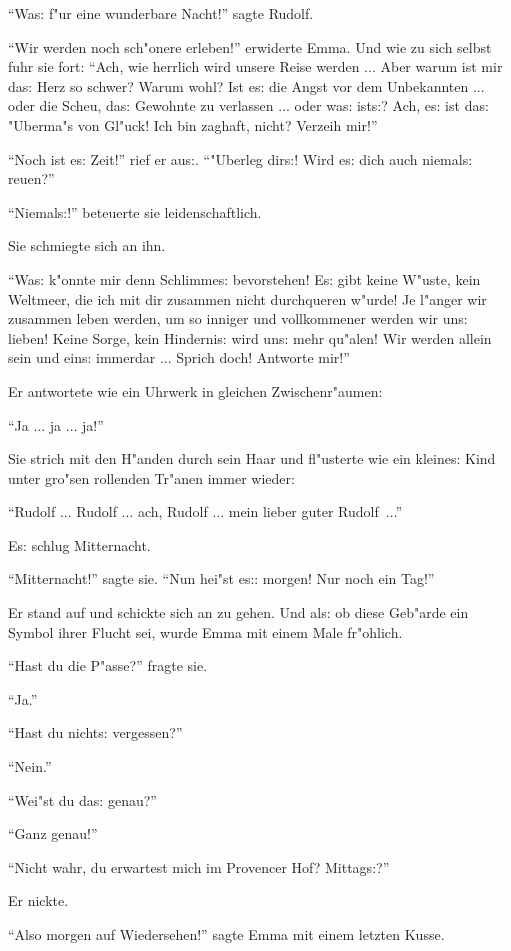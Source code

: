 \documentclass[oneside,12pt]{book}
\newcommand{\s}{s:}%
\begin{document}
"`Wa{\s} f"ur eine wunderbare Nacht!"' sagte Rudolf.

"`Wir werden noch sch"onere erleben!"' erwiderte Emma. Und wie zu
sich selbst fuhr sie fort: "`Ach, wie herrlich wird unsere Reise
werden ... Aber warum ist mir da{\s} Herz so schwer? Warum wohl?
Ist e{\s} die Angst vor dem Unbekannten ... oder die Scheu, da{\s}
Gewohnte zu verlassen ... oder wa{\s} ist{\s}? Ach, e{\s} ist
da{\s} "Uberma"s von Gl"uck! Ich bin zaghaft, nicht? Verzeih
mir!"'

"`Noch ist e{\s} Zeit!"' rief er au{\s}. "`"Uberleg dir{\s}! Wird
e{\s} dich auch niemal{\s} reuen?"'

"`Niemal{\s}!"' beteuerte sie leidenschaftlich.

Sie schmiegte sich an ihn.

"`Wa{\s} k"onnte mir denn Schlimme{\s} bevorstehen! E{\s} gibt
keine W"uste, kein Weltmeer, die ich mit dir zusammen nicht
durchqueren w"urde! Je l"anger wir zusammen leben werden, um so
inniger und vollkommener werden wir un{\s} lieben! Keine Sorge,
kein Hinderni{\s} wird un{\s} mehr qu"alen! Wir werden allein sein
und ein{\s} immerdar ... Sprich doch! Antworte mir!"'

Er antwortete wie ein Uhrwerk in gleichen Zwischenr"aumen:

"`Ja ... ja ... ja!"'

Sie strich mit den H"anden durch sein Haar und fl"usterte wie ein
kleine{\s} Kind unter gro"sen rollenden Tr"anen immer wieder:

"`Rudolf ... Rudolf ... ach, Rudolf ... mein lieber guter
Rudolf~..."'

E{\s} schlug Mitternacht.

"`Mitternacht!"' sagte sie. "`Nun hei"st e{\s}: morgen! Nur noch
ein Tag!"'

Er stand auf und schickte sich an zu gehen. Und al{\s} ob diese
Geb"arde ein Symbol ihrer Flucht sei, wurde Emma mit einem Male
fr"ohlich.

"`Hast du die P"asse?"' fragte sie.

"`Ja."'

"`Hast du nicht{\s} vergessen?"'

"`Nein."'

"`Wei"st du da{\s} genau?"'

"`Ganz genau!"'

"`Nicht wahr, du erwartest mich im Provencer Hof? Mittag{\s}?"'

Er nickte.

"`Also morgen auf Wiedersehen!"' sagte Emma mit einem letzten
Kusse.
\end{document}
